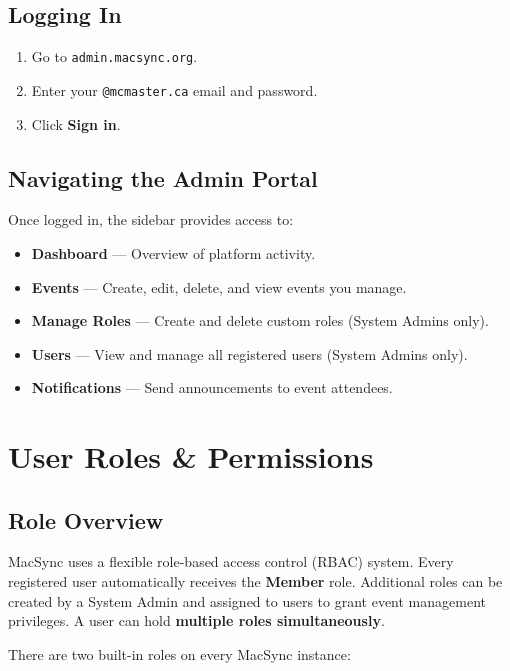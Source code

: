 \documentclass[12pt, twoside]{report}
\newcommand{\uielem}[1]{\textbf{#1}}
\begin{document}
\section{Logging In}

\begin{enumerate}
  \item Go to \texttt{admin.macsync.org}.
  \item Enter your \texttt{@mcmaster.ca} email and password.
  \item Click \uielem{Sign in}.
\end{enumerate}

\section{Navigating the Admin Portal}

Once logged in, the sidebar provides access to:

\begin{itemize}
  \item \uielem{Dashboard} --- Overview of platform activity.
  \item \uielem{Events} --- Create, edit, delete, and view events you manage.
  \item \uielem{Manage Roles} --- Create and delete custom roles
        (System Admins only).
  \item \uielem{Users} --- View and manage all registered users
        (System Admins only).
  \item \uielem{Notifications} --- Send announcements to event attendees.
\end{itemize}


\chapter{User Roles \& Permissions}
\label{chap:roles}

\section{Role Overview}

MacSync uses a flexible role-based access control (RBAC) system. Every registered
user automatically receives the \textbf{Member} role. Additional roles can be
created by a System Admin and assigned to users to grant event management privileges.
A user can hold \textbf{multiple roles simultaneously}.

There are two built-in roles on every MacSync instance:
\end{document}
